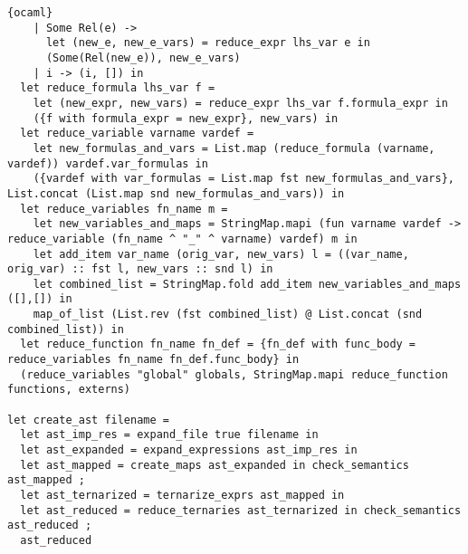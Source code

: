 \begin{lstlisting}{ocaml}
    | Some Rel(e) ->
      let (new_e, new_e_vars) = reduce_expr lhs_var e in
      (Some(Rel(new_e)), new_e_vars)
    | i -> (i, []) in
  let reduce_formula lhs_var f =
    let (new_expr, new_vars) = reduce_expr lhs_var f.formula_expr in
    ({f with formula_expr = new_expr}, new_vars) in
  let reduce_variable varname vardef =
    let new_formulas_and_vars = List.map (reduce_formula (varname, vardef)) vardef.var_formulas in
    ({vardef with var_formulas = List.map fst new_formulas_and_vars}, List.concat (List.map snd new_formulas_and_vars)) in
  let reduce_variables fn_name m =
    let new_variables_and_maps = StringMap.mapi (fun varname vardef -> reduce_variable (fn_name ^ "_" ^ varname) vardef) m in
    let add_item var_name (orig_var, new_vars) l = ((var_name, orig_var) :: fst l, new_vars :: snd l) in
    let combined_list = StringMap.fold add_item new_variables_and_maps ([],[]) in
    map_of_list (List.rev (fst combined_list) @ List.concat (snd combined_list)) in
  let reduce_function fn_name fn_def = {fn_def with func_body = reduce_variables fn_name fn_def.func_body} in
  (reduce_variables "global" globals, StringMap.mapi reduce_function functions, externs)

let create_ast filename =
  let ast_imp_res = expand_file true filename in
  let ast_expanded = expand_expressions ast_imp_res in
  let ast_mapped = create_maps ast_expanded in check_semantics ast_mapped ;
  let ast_ternarized = ternarize_exprs ast_mapped in
  let ast_reduced = reduce_ternaries ast_ternarized in check_semantics ast_reduced ;
  ast_reduced
\end{lstlisting}
